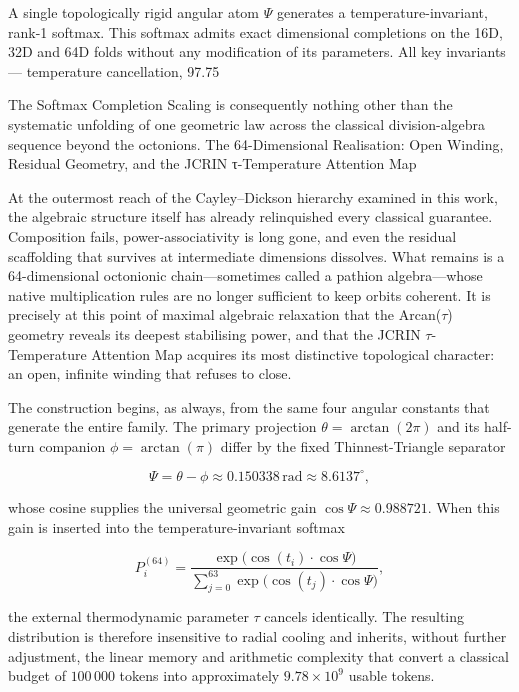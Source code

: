 A single topologically rigid angular atom \(\Psi\) generates a temperature-invariant, rank-1 softmax. 
This softmax admits exact dimensional completions on the 16D, 32D and 64D folds without any modification of its parameters. 
All key invariants — temperature cancellation, 97.75 %

The Softmax Completion Scaling is consequently nothing other than the systematic unfolding of one geometric law across the classical division-algebra sequence beyond the octonions. The 64-Dimensional Realisation: Open Winding, Residual Geometry, and the JCRIN τ-Temperature Attention Map

At the outermost reach of the Cayley–Dickson hierarchy examined in this work, the algebraic structure itself has already relinquished every classical guarantee. Composition fails, power-associativity is long gone, and even the residual scaffolding that survives at intermediate dimensions dissolves. What remains is a 64-dimensional octonionic chain—sometimes called a pathion algebra—whose native multiplication rules are no longer sufficient to keep orbits coherent. It is precisely at this point of maximal algebraic relaxation that the Arcan(\(\tau\)) geometry reveals its deepest stabilising power, and that the JCRIN \(\tau\)-Temperature Attention Map acquires its most distinctive topological character: an open, infinite winding that refuses to close.

The construction begins, as always, from the same four angular constants that generate the entire family. The primary projection \(\theta = \arctan(2\pi)\) and its half-turn companion \(\phi = \arctan(\pi)\) differ by the fixed Thinnest-Triangle separator

\[
\Psi = \theta - \phi \approx 0.150338\,\text{rad} \approx 8.6137^\circ,
\]

whose cosine supplies the universal geometric gain \(\cos\Psi \approx 0.988721\). When this gain is inserted into the temperature-invariant softmax

\[
P_i^{(64)} = \frac{\exp\bigl(\cos(t_i)\cdot\cos\Psi\bigr)}{\sum_{j=0}^{63}\exp\bigl(\cos(t_j)\cdot\cos\Psi\bigr)},
\]

the external thermodynamic parameter \(\tau\) cancels identically. The resulting distribution is therefore insensitive to radial cooling and inherits, without further adjustment, the linear memory and arithmetic complexity that convert a classical budget of \(100\,000\) tokens into approximately \(9.78 \times 10^9\) usable tokens.

